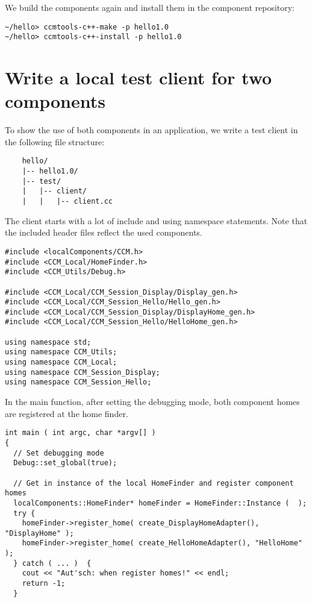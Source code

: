\noindent
We build the components again and install them in the component repository:
\begin{verbatim}
~/hello> ccmtools-c++-make -p hello1.0
~/hello> ccmtools-c++-install -p hello1.0
\end{verbatim}



\section{Write a local test client for two components}

To show the use of both components in an application, we write a test client in
the following file structure:
\begin{verbatim}
    hello/
    |-- hello1.0/
    |-- test/
    |   |-- client/
    |   |   |-- client.cc 
\end{verbatim}

\noindent
The client starts with a lot of include and using namespace statements. Note
that the included header files reflect the used components.
\begin{small}
\begin{verbatim}
#include <localComponents/CCM.h>
#include <CCM_Local/HomeFinder.h>
#include <CCM_Utils/Debug.h>

#include <CCM_Local/CCM_Session_Display/Display_gen.h>
#include <CCM_Local/CCM_Session_Hello/Hello_gen.h>
#include <CCM_Local/CCM_Session_Display/DisplayHome_gen.h>
#include <CCM_Local/CCM_Session_Hello/HelloHome_gen.h>

using namespace std;
using namespace CCM_Utils;
using namespace CCM_Local;
using namespace CCM_Session_Display;
using namespace CCM_Session_Hello;
\end{verbatim}
\end{small}

\noindent
In the main function, after setting the debugging mode, both component homes are
registered at the home finder.
\begin{small}
\begin{verbatim}
int main ( int argc, char *argv[] )
{
  // Set debugging mode
  Debug::set_global(true);

  // Get in instance of the local HomeFinder and register component homes
  localComponents::HomeFinder* homeFinder = HomeFinder::Instance (  );
  try {                       
    homeFinder->register_home( create_DisplayHomeAdapter(), "DisplayHome" );
    homeFinder->register_home( create_HelloHomeAdapter(), "HelloHome" );
  } catch ( ... )  {
    cout << "Aut'sch: when register homes!" << endl;
    return -1;
  }
\end{verbatim}
\end{small}

